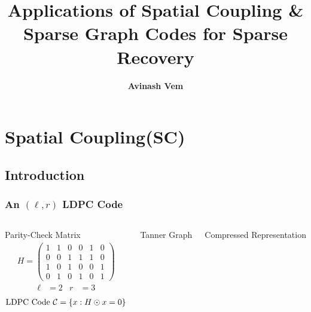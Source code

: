 \documentclass[10pt]{beamer}
\begin{document}
\title{\bf Applications of Spatial Coupling \& \\ Sparse Graph Codes for Sparse Recovery}
\author{\textbf{Avinash Vem}} 
\vspace{10pt}

\date{} %

\frame{\titlepage}
\frame{\tableofcontents}
\section{Spatial Coupling(SC)}
\subsection{Introduction}
\begin{frame}\frametitle{An $(\ell,r)$ LDPC Code}
\begin{columns}
\begin{defn}{Parity-Check Matrix}
\centering
\begin{align*}
H=
\begin{pmatrix}
1 & 1 & 0 & 0 & 1 & 0\\
0 & 0 & 1 & 1 & 1 & 0\\
1 & 0 & 1 & 0 & 0 & 1\\
0 & 1 & 0 & 1 & 0 & 1  
\end{pmatrix}
\end{align*}
\begin{align*}
  \ell&=2 & r&=3
\end{align*}
\begin{align*}
\text{LDPC Code } \mathcal{C}=\{x: H\odot x=0 \}
\end{align*}
\end{defn}
\begin{defn}{Tanner Graph}
\centering
\vspace{0.6cm}
\scalebox{0.65}{}
\end{defn}
\vspace{0.3cm}
\begin{defn}{Compressed Representation}
\centering
\vspace{0.3cm}
\scalebox{0.65}{}  
\end{defn}
\end{columns}
\end{frame}
\end{document}
